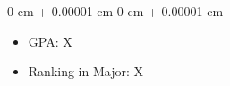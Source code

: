 \documentclass[10pt, letterpaper]{article}
\newenvironment{highlights}{
    \begin{itemize}[
        topsep=0.10 cm,
        parsep=0.10 cm,
        partopsep=0pt,
        itemsep=0pt,
        leftmargin=0 cm + 10pt
    ]
}{
    \end{itemize}
} %
\newenvironment{onecolentry}{
    \begin{adjustwidth}{
        0 cm + 0.00001 cm
    }{
        0 cm + 0.00001 cm
    }
}{
    \end{adjustwidth}
} %
\newenvironment{twocolentry}[2][]{
    \onecolentry
    \def\secondColumn{#2}
    \setcolumnwidth{\fill, 4.5 cm}
    \begin{paracol}{2}
}{
    \switchcolumn \raggedleft \secondColumn
    \end{paracol}
    \endonecolentry
} %
\begin{document}
\vspace{0.10 cm}

\begin{onecolentry}
\begin{highlights}
\item GPA: X
\item Ranking in Major: X
\end{highlights}
\end{onecolentry}






\end{document}
